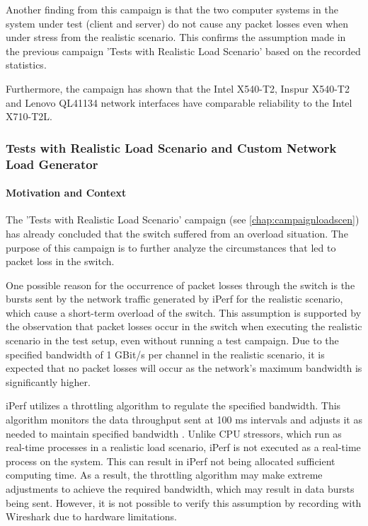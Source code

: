 Another finding from this campaign is that the two computer systems in the system under test (client and server) do not cause any packet losses even when under stress from the realistic scenario. This confirms the assumption made in the previous campaign 'Tests with Realistic Load Scenario' based on the recorded statistics.

Furthermore, the campaign has shown that the Intel X540-T2, Inspur X540-T2 and Lenovo QL41134 network interfaces have comparable reliability to the Intel X710-T2L.

\subsubsection{Tests with Realistic Load Scenario and Custom Network Load Generator}
\paragraph{Motivation and Context}
The 'Tests with Realistic Load Scenario' campaign (see \ref{chap:campaignloadscen}) has already concluded that the switch suffered from an overload situation. The purpose of this campaign is to further analyze the circumstances that led to packet loss in the switch.

One possible reason for the occurrence of packet losses through the switch is the bursts sent by the network traffic generated by iPerf for the realistic scenario, which cause a short-term overload of the switch. This assumption is supported by the observation that packet losses occur in the switch when executing the realistic scenario in the test setup, even without running a test campaign. Due to the specified bandwidth of 1 GBit/s per channel in the realistic scenario, it is expected that no packet losses will occur as the network's maximum bandwidth is significantly higher.

iPerf utilizes a throttling algorithm to regulate the specified bandwidth. This algorithm monitors the data throughput sent at 100 ms intervals and adjusts it as needed to maintain specified bandwidth \cite{reli03}. Unlike CPU stressors, which run as real-time processes in a realistic load scenario, iPerf is not executed as a real-time process on the system. This can result in iPerf not being allocated sufficient computing time. As a result, the throttling algorithm may make extreme adjustments to achieve the required bandwidth, which may result in data bursts being sent. However, it is not possible to verify this assumption by recording with Wireshark due to hardware limitations.

